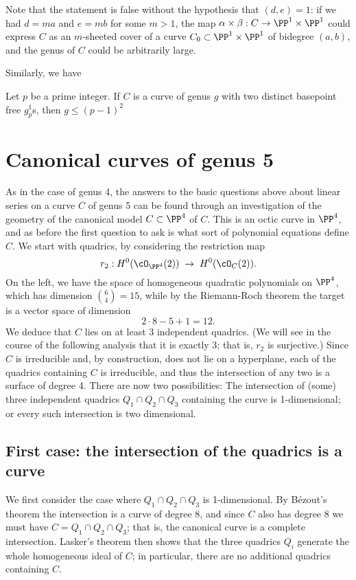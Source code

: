 Note that the statement is false without the hypothesis that $(d,e) = 1$: if we had $d=ma$ and $e=mb$ for some $m > 1$, the map $\alpha \times \beta : C \to \PP^1 \times \PP^1$ could express $C$ as an $m$-sheeted cover of a curve $C_0 \subset \PP^1 \times \PP^1$ of bidegree $(a,b)$, and the genus of $C$ could be arbitrarily large.

Similarly, we have

\begin{proposition}
Let $p$ be a prime integer. If $C$ is a curve of genus $g$ with two distinct basepoint free $g^1_p$s, then $g \leq (p-1)^2$
\end{proposition}

\section{Canonical curves of genus 5}

As in the  case of genus 4, the answers to the basic questions above about linear series on a curve $C$ of genus 5 can be found through an investigation of the geometry of the canonical model $C \subset \PP^4$ of $C$. This is an octic curve in $\PP^4$, and as before the first question to ask is what sort of polynomial equations define $C$. We start with quadrics, by considering the restriction map
$$
r_2 : H^0(\cO_{\PP^4}(2)) \; \to \; H^0(\cO_{C}(2)).
$$
On the left, we have the space of homogeneous quadratic polynomials on $\PP^4$, which has dimension $\binom{6}{4} = 15$, while by the Riemann-Roch theorem the target is a vector space of dimension
$$
2\cdot8 - 5 + 1 = 12.
$$
We deduce that $C$ lies on at least 3 independent quadrics. (We will see in the course of the following analysis that it is exactly 3; that is, $r_2$ is surjective.) Since $C$ is irreducible and, by construction, does not lie on a hyperplane, each of the quadrics containing $C$ is irreducible, and thus the intersection of any two is a surface of degree 4. There are now two possibilities:  The intersection of (some) three independent  quadrics $Q_1 \cap Q_2 \cap Q_3$ containing the curve is 1-dimensional; or every such intersection is two dimensional. 

\subsection{First case: the intersection of the quadrics is a curve}\label{non-trigonal genus 5}

We first consider the case where $Q_1 \cap Q_2 \cap Q_3$ is 1-dimensional.  By B\'ezout's theorem the intersection is a curve of degree 8, and since $C$ also has degree 8 we must have $C=Q_1 \cap Q_2 \cap Q_3$; that is, the canonical curve is a complete intersection. Lasker's theorem then shows that the three quadrics $Q_i$ generate the whole homogeneous ideal of $C$; in particular, there are no additional quadrics containing $C$.

